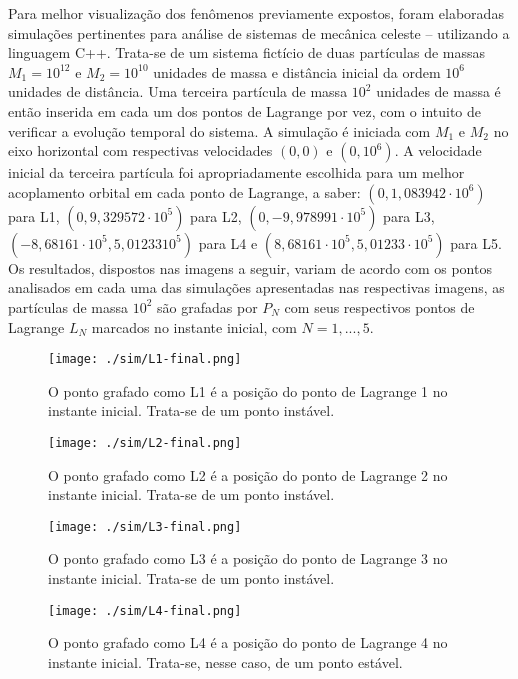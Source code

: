    Para melhor visualização dos fenômenos previamente expostos, foram elaboradas simulações pertinentes para análise de sistemas de mecânica celeste \cite{sashalag, sashaeng} -- utilizando a linguagem C++. Trata-se de um sistema fictício de duas partículas de massas $M_1 = 10^{12}$ e $M_2 = 10^{10}$ unidades de massa e distância inicial da ordem $10^6$ unidades de distância. Uma terceira partícula de massa $10^2$ unidades de massa é então inserida em cada um dos pontos de Lagrange por vez, com o intuito de verificar a evolução temporal do sistema. A simulação é iniciada com $M_1$ e $M_2$ no eixo horizontal com respectivas velocidades $(0,0)$ e $(0, 10^6)$. A velocidade inicial da terceira partícula foi apropriadamente escolhida para um melhor acoplamento orbital em cada ponto de Lagrange, a saber: $(0,1,083942 \cdot 10^6)$ para L1, $(0,9,329572 \cdot 10^5)$ para L2, $(0,-9,978991 \cdot 10^5)$ para L3, $(-8,68161\cdot 10^5, 5,01233 10^5)$ para L4 e $(8,68161\cdot 10^5, 5,01233 \cdot 10^5)$ para L5. Os resultados, dispostos nas imagens a seguir, variam de acordo com os pontos analisados em cada uma das simulações apresentadas nas respectivas imagens, as partículas de massa $10^2$ são grafadas por $P_{N}$ com seus respectivos pontos de Lagrange $L_{N}$ marcados no instante inicial, com $N = 1,..., 5$. 
   
\begin{figure}[h]
\centering
\texttt{[image: ./sim/L1-final.png]}
\caption{O ponto grafado como L1 é a posição do ponto de Lagrange 1 no instante inicial. Trata-se de um ponto instável.}
\end{figure}

\begin{figure}[h]
\centering
\texttt{[image: ./sim/L2-final.png]}
\caption{O ponto grafado como L2 é a posição do ponto de Lagrange 2 no instante inicial. Trata-se de um ponto instável.}
\end{figure}

\begin{figure}[H]
\centering
\texttt{[image: ./sim/L3-final.png]}
\caption{O ponto grafado como L3 é a posição do ponto de Lagrange 3 no instante inicial. Trata-se de um ponto instável.}
\end{figure}

\begin{figure}[H]
\centering
\texttt{[image: ./sim/L4-final.png]}
\caption{O ponto grafado como L4 é a posição do ponto de Lagrange 4 no instante inicial. Trata-se, nesse caso, de um ponto estável.}
\end{figure}


